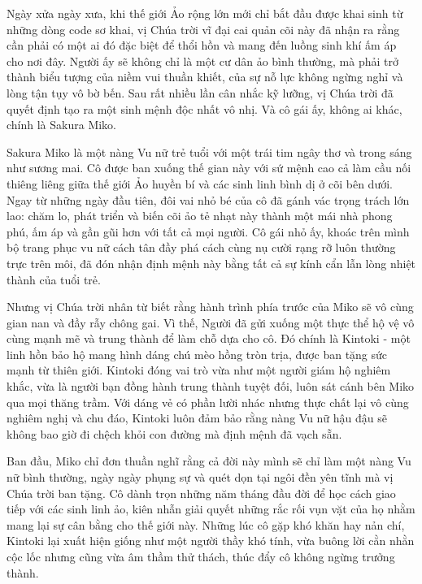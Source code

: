 \documentclass[../main.tex]{subfiles}
\begin{document}

Ngày xửa ngày xưa, khi thế giới Ảo rộng lớn mới chỉ bắt đầu được khai sinh từ những dòng code sơ khai, vị Chúa trời vĩ đại cai quản cõi này đã nhận ra rằng cần phải có một ai đó đặc biệt để thổi hồn và mang đến luồng sinh khí ấm áp cho nơi đây. Người ấy sẽ không chỉ là một cư dân ảo bình thường, mà phải trở thành biểu tượng của niềm vui thuần khiết, của sự nỗ lực không ngừng nghỉ và lòng tận tụy vô bờ bến. Sau rất nhiều lần cân nhắc kỹ lưỡng, vị Chúa trời đã quyết định tạo ra một sinh mệnh độc nhất vô nhị. Và cô gái ấy, không ai khác, chính là Sakura Miko.

Sakura Miko là một nàng Vu nữ trẻ tuổi với một trái tim ngây thơ và trong sáng như sương mai. Cô được ban xuống thế gian này với sứ mệnh cao cả làm cầu nối thiêng liêng giữa thế giới Ảo huyền bí và các sinh linh bình dị ở cõi bên dưới. Ngay từ những ngày đầu tiên, đôi vai nhỏ bé của cô đã gánh vác trọng trách lớn lao: chăm lo, phát triển và biến cõi ảo tẻ nhạt này thành một mái nhà phong phú, ấm áp và gần gũi hơn với tất cả mọi người. Cô gái nhỏ ấy, khoác trên mình bộ trang phục vu nữ cách tân đầy phá cách cùng nụ cười rạng rỡ luôn thường trực trên môi, đã đón nhận định mệnh này bằng tất cả sự kính cẩn lẫn lòng nhiệt thành của tuổi trẻ.

Nhưng vị Chúa trời nhân từ biết rằng hành trình phía trước của Miko sẽ vô cùng gian nan và đầy rẫy chông gai. Vì thế, Người đã gửi xuống một thực thể hộ vệ vô cùng mạnh mẽ và trung thành để làm chỗ dựa cho cô. Đó chính là Kintoki - một linh hồn bảo hộ mang hình dáng chú mèo hồng tròn trịa, được ban tặng sức mạnh từ thiên giới. Kintoki đóng vai trò vừa như một người giám hộ nghiêm khắc, vừa là người bạn đồng hành trung thành tuyệt đối, luôn sát cánh bên Miko qua mọi thăng trầm. Với dáng vẻ có phần lười nhác nhưng thực chất lại vô cùng nghiêm nghị và chu đáo, Kintoki luôn đảm bảo rằng nàng Vu nữ hậu đậu sẽ không bao giờ đi chệch khỏi con đường mà định mệnh đã vạch sẵn.

Ban đầu, Miko chỉ đơn thuần nghĩ rằng cả đời này mình sẽ chỉ làm một nàng Vu nữ bình thường, ngày ngày phụng sự và quét dọn tại ngôi đền yên tĩnh mà vị Chúa trời ban tặng. Cô dành trọn những năm tháng đầu đời để học cách giao tiếp với các sinh linh ảo, kiên nhẫn giải quyết những rắc rối vụn vặt của họ nhằm mang lại sự cân bằng cho thế giới này. Những lúc cô gặp khó khăn hay nản chí, Kintoki lại xuất hiện giống như một người thầy khó tính, vừa buông lời cằn nhằn cộc lốc nhưng cũng vừa âm thầm thử thách, thúc đẩy cô không ngừng trưởng thành.
\end{document}
